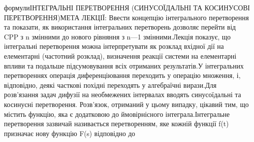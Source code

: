 \documentclass[
  ukrainian,
]{article}
\begin{document}
{{формули}{ІНТЕГРАЛЬНІ ПЕРЕТВОРЕННЯ (СИНУСОЇДАЛЬНІ ТА КОСИНУСОВІ ПЕРЕТВОРЕННЯ)МЕТА ЛЕКЦІЇ: Ввести концепцію інтегрального перетворення та показати, як використання інтегральних перетворень дозволяє перейти від CPP з n змінними до нового рівняння з n---1 змінними.Лекція показує, що інтегральні перетворення можна інтерпретувати як розклад вхідної дії на елементарні (частотний розклад), визначення реакції системи на елементарні впливи та подальше підсумовування всіх отриманих результатів.У інтегральних перетвореннях операція диференціювання переходить у операцію множення, і, відповідно, деякі часткові похідні переходять у алгебраїчні вирази.Для розв'язання задач дифузії на необмежених інтервалах вводять синусоїдальні та косинусні перетворення. Розв'язок, отриманий у цьому випадку, цікавий тим, що містить функцію, яка є додатковою до ймовірнісного інтеграла.Інтегральне перетворення зазвичай називається перетворенням, яке кожній функції f(t) призначає нову функцію F(s) відповідно до }}
\end{document}
